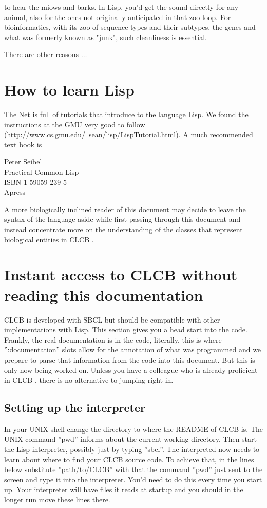 \documentclass{book}
\newcommand\CLCB{CLCB }
\begin{document}
to hear the miows and barks.  In Lisp, you'd get the sound directly for
any animal, also for the ones not originally anticipated in that zoo loop.
For bioinformatics, with its zoo of sequence types and their subtypes,
the genes and what was formerly known as "junk", such cleanliness is essential.

There are other reasons $\ldots$

\section{How to learn Lisp}

The Net is full of tutorials that introduce to the language
Lisp. We found the instructions at the GMU very good to follow
(http://www.cs.gmu.edu/~sean/lisp/LispTutorial.html). A much recommended
text book is

	Peter Seibel\\
	Practical Common Lisp\\
	ISBN 1-59059-239-5\\
	Apress

A more biologically inclined reader of this document may decide
to leave the syntax of the language aside while first passing through
this document and instead concentrate more on the understanding
of the classes that represent biological entities in \CLCB.

\section{Instant access to \CLCB without reading this documentation}

\CLCB is developed with SBCL but should be compatible with other
implementations with Lisp. This section gives you a head start into the
code. Frankly, the real documentation is in the code, literally, this is
where '':documentation'' slots allow for the annotation of what was
programmed and we prepare to parse that information from the code into
this document. But this is only now being worked on.
Unless you have a colleague who is already proficient in \CLCB, 
there is no alternative to jumping right in.

\subsection{Setting up the interpreter}

In your UNIX shell change the directory to where the README 
of \CLCB is. The UNIX command ''pwd'' informs about the current
working directory. Then start the Lisp interpreter, possibly just
by typing ''sbcl''. The interpreted now needs to learn about 
where to find your \CLCB source code. To achieve that, in the lines below
substitute ''path/to/CLCB'' with that the command ''pwd'' just sent to
the screen and type it into the interpreter. You'd need to do this
every time you start up. Your interpreter will have files it reads at
startup and you should in the longer run move these lines there.
\end{document}

